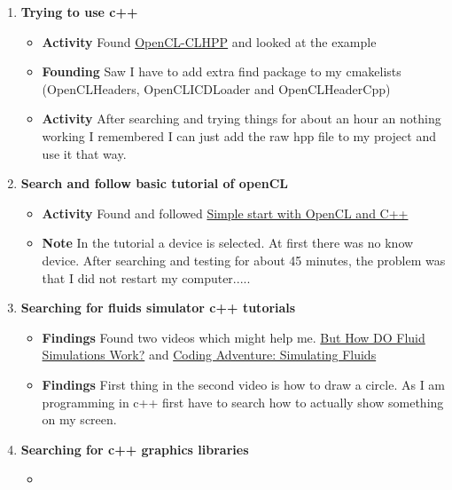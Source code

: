 \documentclass{article}
\begin{document}
\begin{enumerate}
    \item \textbf{Trying to use c++}
    \begin{itemize}
        \item \textbf{Activity} Found \href{https://github.com/KhronosGroup/OpenCL-CLHPP}{OpenCL-CLHPP} and looked at the example
        \item \textbf{Founding} Saw I have to add extra find package to my cmakelists (OpenCLHeaders, OpenCLICDLoader and OpenCLHeaderCpp)
        \item \textbf{Activity} After searching and trying things for about an hour an nothing working I remembered I can just add the raw hpp file to my project and use it that way.
    \end{itemize}

    \item \textbf{Search and follow basic tutorial of openCL}
    \begin{itemize}
        \item \textbf{Activity} Found and followed \href{https://programmerclick.com/article/47811146604/}{Simple start with OpenCL and C++}
        \item \textbf{Note} In the tutorial a device is selected. At first there was no know device. After searching and testing for about 45 minutes, the problem was that I did not restart my computer.....
    \end{itemize}

    \item \textbf{Searching for fluids simulator c++ tutorials}
    \begin{itemize}
        \item \textbf{Findings} Found two videos which might help me. \href{https://www.youtube.com/watch?v=qsYE1wMEMPA}{But How DO Fluid Simulations Work?} and \href{https://www.youtube.com/watch?v=rSKMYc1CQHE}{Coding Adventure: Simulating Fluids}
        \item \textbf{Findings} First thing in the second video is how to draw a circle. As I am programming in c++ first have to search how to actually show something on my screen.
    \end{itemize}
    
    \item \textbf{Searching for c++ graphics libraries}
    \begin{itemize}
        \item 
    \end{itemize}
\end{enumerate}
\end{document}
